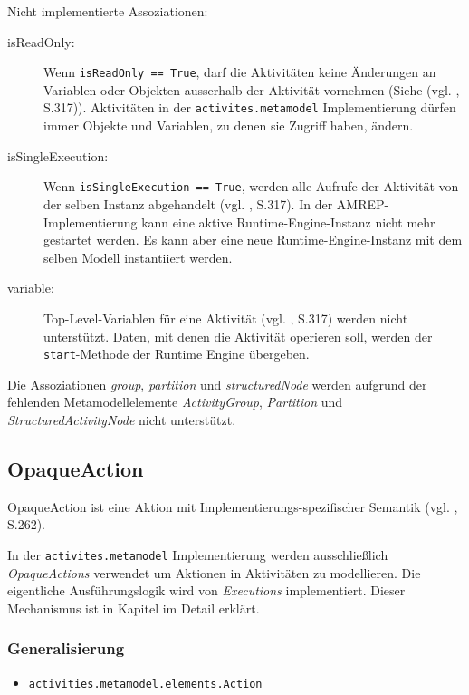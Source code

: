 Nicht implementierte Assoziationen:
\begin{description}
\item[isReadOnly:] Wenn \texttt{isReadOnly == True}, darf die Aktivitäten keine Änderungen an Variablen oder Objekten ausserhalb der Aktivität vornehmen (Siehe (vgl. \citep{OMG2009}, S.317)). Aktivitäten in der \texttt{activites.metamodel} Implementierung dürfen immer Objekte und Variablen, zu denen sie Zugriff haben, ändern.
\item[isSingleExecution:]  Wenn \texttt{isSingleExecution == True}, werden alle Aufrufe der Aktivität von der selben Instanz abgehandelt (vgl. \citep{OMG2009}, S.317). In der AMREP-Implementierung kann eine aktive Runtime-Engine-Instanz nicht mehr gestartet werden. Es kann aber eine neue Runtime-Engine-Instanz mit dem selben Modell instantiiert werden.
\item[variable:] Top-Level-Variablen für eine Aktivität (vgl. \citep{OMG2009}, S.317) werden nicht unterstützt. Daten, mit denen die Aktivität operieren soll, werden der \texttt{start}-Methode der Runtime Engine übergeben.
\end{description}
Die Assoziationen \emph{group}, \emph{partition} und \emph{structuredNode} werden aufgrund der fehlenden Metamodellelemente \emph{ActivityGroup}, \emph{Partition} und \emph{StructuredActivityNode} nicht unterstützt.


\subsection{OpaqueAction}
\label{meta-opaque}
OpaqueAction ist eine Aktion mit Implementierungs-spezifischer Semantik (vgl. \citep{OMG2009}, S.262).

In der \texttt{activites.metamodel} Implementierung werden ausschließlich \emph{OpaqueActions} verwendet um Aktionen in Aktivitäten zu modellieren. Die eigentliche Ausführungslogik wird von \emph{Executions} implementiert. Dieser Mechanismus ist in Kapitel  im Detail erklärt.

\subsubsection{Generalisierung}
\begin{itemize}
\item \texttt{activities.metamodel.elements.Action}
\end{itemize}

